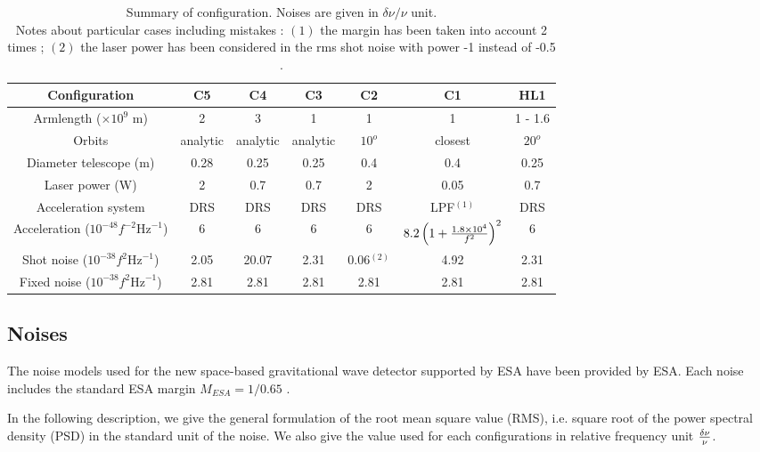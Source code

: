 \documentclass{iopart}
\begin{document}
\begin{table}[htdp]
\begin{center}
\begin{tabular}{|c|c|c|c|c|c|c|}
\hline
Configuration 				& C5 	& C4	 	& C3 	& C2 	& C1  	& HL1 	\\
\hline
Armlength ($\times 10^9 $ m) 	& 2 		& 3 		& 1		& 1		& 1 	  	&  1 - 1.6 		\\
Orbits					& analytic & analytic & analytic & $10^o$ & closest 	& $20^o$ \\
\hline
Diameter telescope (m) 		& 0.28 	& 0.25 	& 0.25	& 0.4		& 0.4 	&  0.25 	\\
Laser power (W) 			& 2	 	& 0.7 	& 0.7		& 2		& 0.05 	&  0.7 		\\
Acceleration system 			& DRS	& DRS 	& DRS	& DRS	& LPF$^{(1)}$	&  DRS 	\\
\hline
Acceleration ($ 10^{-48} f^{-2} \textrm{Hz}^{-1}$)  & 6	&  6	& 6	& 6	&  $8.2\left( 1 + {  1.8 \times 10^4 \over f^2 }  \right) ^ 2 $	&   6 \\  %
Shot noise ($ 10^{-38} f^{2}  \textrm{Hz}^{-1}$)  &  2.05 &  20.07 &  2.31 & 0.06$^{(2)}$  & 4.92 & 2.31 \\ %
Fixed noise ($10^{-38} f^{2} \textrm{Hz}^{-1}$)  &  2.81 &  2.81 &  2.81 & 2.81  & 2.81 &  2.81 \\ %
\hline
\end{tabular}
\end{center}
\caption{Summary of configuration. Noises are given in $\delta \nu / \nu$ unit. \\ 
{ \scriptsize Notes about particular cases including mistakes : ${(1)}$ the margin has been taken into account 2 times  ; 
${(2)}$ the laser power has been considered in the rms shot noise  with power -1 instead of -0.5 . } }
\label{T:Configs}
\end{table}%


\subsection{Noises}
\label{SS:Inst:Noises}
The noise models used for the new space-based gravitational wave detector supported by ESA have been provided by ESA.
Each noise includes the standard ESA margin $M_{ESA} = 1 / 0.65 $ .

In the following description, we give the general formulation of the root mean square value (RMS), i.e. square root of the power spectral density (PSD) in the standard unit of the noise. 
We also give the value used for each configurations in relative frequency unit $\delta \nu \over \nu$.
\end{document}
